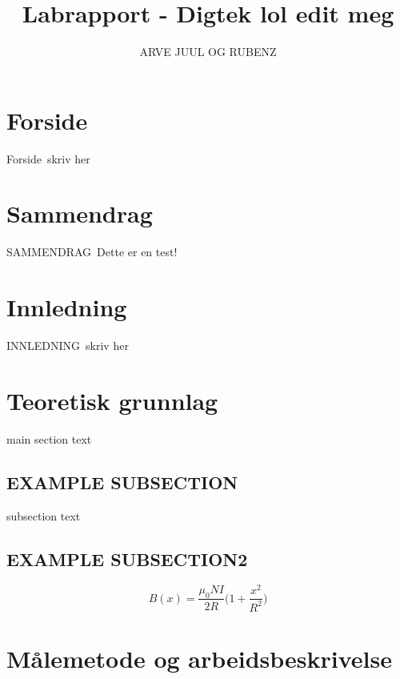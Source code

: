 \documentclass[12pt,norsk,a4paper]{article}
\begin{document}
\title{Labrapport - Digtek lol edit meg} 
\author {ARVE JUUL OG RUBENZ}

\maketitle

\clearpage



\section*{Forside} %
Forside\
skriv her
\clearpage
\setcounter{page}{1}

\section*{Sammendrag}
SAMMENDRAG\
Dette er en test!
\clearpage %

\tableofcontents %
\clearpage

\section{Innledning} 
INNLEDNING\
skriv her
\clearpage

\section{Teoretisk grunnlag}
main section text
    \subsection{EXAMPLE SUBSECTION}
    subsection text
    \subsection{EXAMPLE SUBSECTION2}

        \begin{equation} %
            \label{eq:magnetfelt-spole} %
            B(x) = \frac{\mu_0 N I}{2R} \Bigg(1 + \frac{x^2}{R^2} \Bigg) 
        \end{equation}
\clearpage

\section{Målemetode og arbeidsbeskrivelse}
\clearpage
\end{document}
